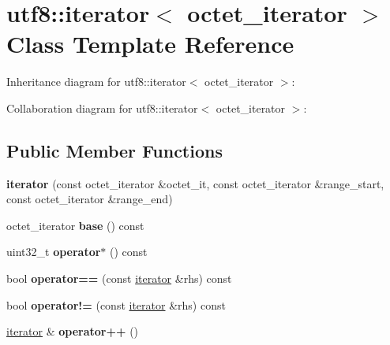 \hypertarget{classutf8_1_1iterator}{}\section{utf8\+:\+:iterator$<$ octet\+\_\+iterator $>$ Class Template Reference}
\label{classutf8_1_1iterator}


Inheritance diagram for utf8\+:\+:iterator$<$ octet\+\_\+iterator $>$\+:


Collaboration diagram for utf8\+:\+:iterator$<$ octet\+\_\+iterator $>$\+:
\subsection*{Public Member Functions}
\begin{DoxyCompactItemize}
\item 
\mbox{\label{classutf8_1_1iterator_a85a9cb70e9e77d2d04eba61612b5ef13}} 
{\bfseries iterator} (const octet\+\_\+iterator \&octet\+\_\+it, const octet\+\_\+iterator \&range\+\_\+start, const octet\+\_\+iterator \&range\+\_\+end)
\item 
\mbox{\label{classutf8_1_1iterator_a486aa7b3906acaec6172b71f56e80316}} 
octet\+\_\+iterator {\bfseries base} () const
\item 
\mbox{\label{classutf8_1_1iterator_a2826e61b8498fdf90467d57cdfb940ca}} 
uint32\+\_\+t {\bfseries operator$\ast$} () const
\item 
\mbox{\label{classutf8_1_1iterator_a4206e65eb4119ac04b2f25a34921134e}} 
bool {\bfseries operator==} (const \mbox{\hyperlink{classutf8_1_1iterator}{iterator}} \&rhs) const
\item 
\mbox{\label{classutf8_1_1iterator_ad978fbd25610e24b9c1f5cabedf41923}} 
bool {\bfseries operator!=} (const \mbox{\hyperlink{classutf8_1_1iterator}{iterator}} \&rhs) const
\item 
\mbox{\label{classutf8_1_1iterator_a93e9ac16a560fab545a05efb6b0a3add}} 
\mbox{\hyperlink{classutf8_1_1iterator}{iterator}} \& {\bfseries operator++} ()
\item 

\end{DoxyCompactItemize}
